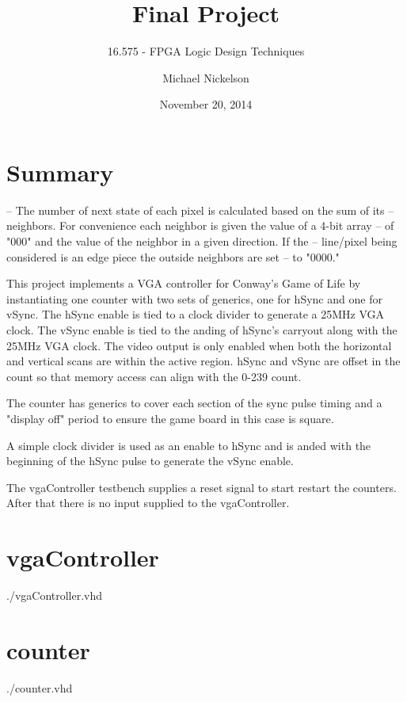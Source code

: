 \documentclass[twoside, letterpaper]{report}
\author{Michael Nickelson}
\title{Final Project}
\subtitle{16.575 - FPGA Logic Design Techniques}
\date{November 20, 2014}
\begin{document}
\maketitle
\newpage\null\thispagestyle{empty}\newpage
{}
\setcounter{page}{1}
\tableofcontents
\cleardoublepage

\chapter{Summary}
\setcounter{page}{1}

-- The number of next state of each pixel is calculated based on the sum of its
-- neighbors. For convenience each neighbor is given the value of a 4-bit array
-- of "000" and the value of the neighbor in a given direction. If the
-- line/pixel being considered is an edge piece the outside neighbors are set
-- to "0000."

This project implements a VGA controller for Conway's Game of Life by instantiating one counter with two sets of generics, one for hSync and one for vSync. The hSync enable is tied to a clock divider to generate a 25MHz VGA clock. The vSync enable is tied to the anding of hSync's carryout along with the 25MHz VGA clock. The video output is only enabled when both the horizontal and vertical scans are within the active region. hSync and vSync are offset in the count so that memory access can align with the 0-239 count.

The counter has generics to cover each section of the sync pulse timing and a "display off" period to ensure the game board in this case is square.

A simple clock divider is used as an enable to hSync and is anded with the beginning of the hSync pulse to generate the vSync enable.

The vgaController testbench supplies a reset signal to start restart the counters. After that there is no input supplied to the vgaController.

\chapter{vgaController}
 {./vgaController.vhd}

\chapter{counter}
 {./counter.vhd}
\end{document}
